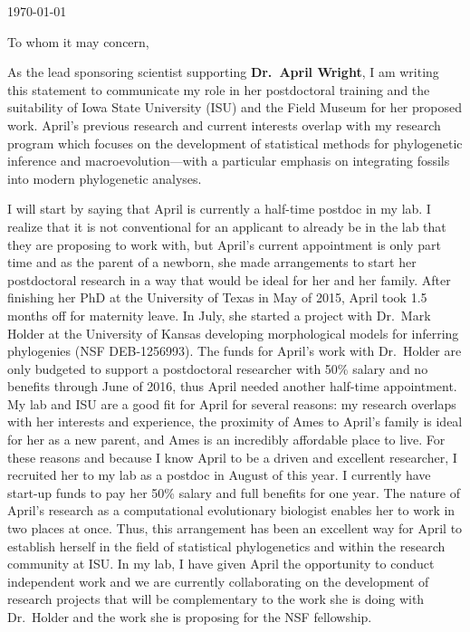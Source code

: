 \documentclass[11pt]{article}
\begin{document}
\thispagestyle{fancy}
\begin{flushright}
\today
\end{flushright}
\vspace{2mm}



\noindent To whom it may concern,

As the lead sponsoring scientist supporting \textbf{Dr.\ April Wright}, I am writing this statement to communicate my role in her postdoctoral training and the suitability of Iowa State University (ISU) and the Field Museum for her proposed work. 
April's previous research and current interests overlap with my research program which focuses on the development of statistical methods for phylogenetic inference and macroevolution---with a particular emphasis on integrating fossils into modern phylogenetic analyses.

I will start by saying that April is currently a half-time postdoc in my lab. 
I realize that it is not conventional for an applicant to already be in the lab that they are proposing to work with, but April's current appointment is only part time and as the parent of a newborn, she made arrangements to start her postdoctoral research in a way that would be ideal for her and her family. 
After finishing her PhD at the University of Texas in May of 2015, April took 1.5 months off for maternity leave.
In July, she started a project with Dr.\ Mark Holder at the University of Kansas developing morphological models for inferring phylogenies (NSF DEB-1256993). 
The funds for April's work with Dr.\ Holder are only budgeted to support a postdoctoral researcher with 50\% salary and no benefits through June of 2016, thus April needed another half-time appointment.
My lab and ISU are a good fit for April for several reasons: my research overlaps with her interests and experience, the proximity of Ames to April's family is ideal for her as a new parent, and Ames is an incredibly affordable place to live. 
For these reasons and because I know April to be a driven and excellent researcher, I recruited her to my lab as a postdoc in August of this year.
I currently have start-up funds to pay her 50\% salary and full benefits for one year.  
The nature of April's research as a computational evolutionary biologist enables her to work in two places at once. Thus, this arrangement has been an excellent way for April to establish herself in the field of statistical phylogenetics and within the research community at ISU. 
In my lab, I have given April the opportunity to conduct independent work and we are currently collaborating on the development of research projects that will be complementary to the work she is doing with Dr.\ Holder and the work she is proposing for the NSF fellowship.
\end{document}
